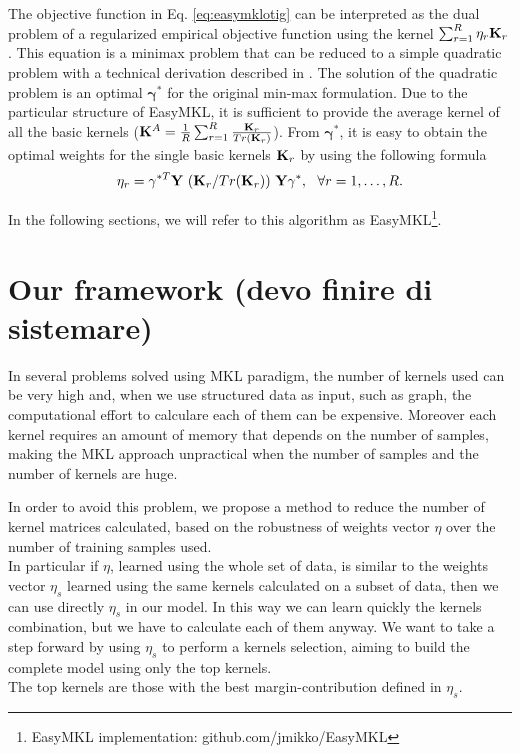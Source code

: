\documentclass{esannV2}
\newcommand{\yy}{{\bf y}}
\newcommand{\KK}{{\bf K}}
\newcommand{\YY}{{\bf Y}}
\newcommand{\XX}{{\bf X}}
\newcommand{\1}{{\bf 1}}
\newcommand{\ggamma}{\pmb{\gamma}}
\begin{document}
The objective function in Eq. \ref{eq:easymklotig} can be interpreted as the dual problem of a regularized empirical objective function using the kernel $\sum_{r=1}^R \eta_r \KK_r$. This equation is a minimax problem that can be reduced  to a simple quadratic problem with a technical derivation described  in \cite{Aiolli2015}. The solution of the quadratic problem is an optimal $\ggamma^*$ for the original min-max formulation. Due to the particular structure of EasyMKL, it is sufficient to provide the average kernel of all the basic kernels ($\KK^A = \frac{1}{R} \sum_{r=1}^R \frac{\KK_r}{Tr(\KK_r)}$). From $\ggamma^*$, it is easy to obtain the optimal weights for the single basic kernels $\KK_r$ by using the following formula
\begin{equation}
\label{eq:easyeta}
	\eta_r = \gamma^{*T} \YY \,\, (\KK_r/Tr(\KK_r)) \,\, \YY \gamma^*, \,\,\,\, \forall r=1,\dots,R.
\end{equation}

In the following sections, we will refer to this algorithm as EasyMKL\footnote{EasyMKL implementation: github.com/jmikko/EasyMKL}.


\section{Our framework (devo finire di sistemare)}
In several problems solved using MKL paradigm, the number of kernels used can be very high and, when we use structured data as input, such as graph, the computational effort to calculare each of them can be expensive. Moreover each kernel requires an amount of memory that depends on the number of samples, making the MKL approach unpractical when the number of samples and the number of kernels are huge.

In order to avoid this problem, we propose a method to reduce the number of kernel matrices calculated, based on the robustness of weights vector $\eta$ over the number of training samples used.\\
In particular if $\eta$, learned using the whole set of data, is similar to the weights vector $\eta_s$ learned using the same kernels calculated on a subset of data, then we can use directly $\eta_s$ in our model.
In this way we can learn quickly the kernels combination, but we have to calculate each of them anyway.
We want to take a step forward by using $\eta_s$ to perform a kernels selection, aiming to build the complete model using only the top kernels.\\
The top kernels are those with the best margin-contribution defined in $\eta_s$.
\end{document}

